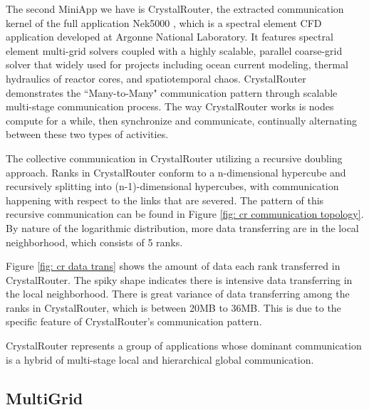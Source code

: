 \documentclass[conference]{IEEEtran}
\begin{document}
The second MiniApp we have is CrystalRouter, the extracted communication kernel of the full application Nek5000 \cite{crystalrouter}, which is a spectral element CFD application developed at Argonne National Laboratory. It features spectral element multi-grid solvers coupled with a highly scalable, parallel coarse-grid solver that widely used for projects including ocean current modeling, thermal hydraulics of reactor cores, and spatiotemporal chaos. CrystalRouter demonstrates the ``Many-to-Many" communication pattern through scalable multi-stage communication process. The way CrystalRouter works is nodes compute for a while, then synchronize and communicate, continually alternating between these two types of activities.

The collective communication in CrystalRouter utilizing a recursive doubling approach. Ranks in CrystalRouter conform to a n-dimensional hypercube and recursively splitting into (n-1)-dimensional hypercubes, with communication happening with respect to the links that are severed. The pattern of this recursive communication can be found in Figure \ref{fig: cr communication topology}. By nature of the logarithmic distribution, more data transferring are in the local neighborhood, which consists of 5 ranks.

Figure \ref{fig: cr data trans} shows the amount of data each rank transferred in CrystalRouter. The spiky shape indicates there is intensive data transferring in the local neighborhood. There is great variance of data transferring among the ranks in CrystalRouter, which is between 20MB to 36MB. This is due to the specific feature of CrystalRouter's communication pattern.

CrystalRouter represents a group of applications whose dominant communication is a hybrid of multi-stage local and hierarchical global communication.


\subsection{MultiGrid}
\label{sec:multigrid}
\end{document}
